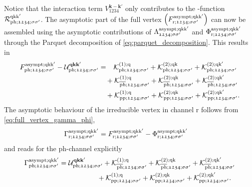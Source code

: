 \documentclass[../../main.tex]{subfiles}
\begin{document}
Notice that the interaction term $V^{\textbf{k}-\textbf{k}'}_{\mathfrak{1234}}$ only contributes to the -function $\mathcal{R}^{\text{q}\text{k}\text{k}'}_{\text{ph};\mathfrak{1234};\sigma\sigma'}$. The asymptotic part of the full vertex $\left (F_{\text{r};\mathfrak{1234};\sigma\sigma'}^{\text{asympt};\text{q}\text{k}\text{k}'}\right )$ can now be assembled using the asymptotic contributions of $\Lambda^{\text{asympt};\text{q}\text{k}\text{k}'}_{\mathfrak{1234};\sigma\sigma'}$ and $\Phi_{\text{r};\mathfrak{1234};\sigma\sigma'}^{\text{asympt};\text{q}\text{k}\text{k}'}$ through the Parquet decomposition of \eqref{eq:parquet_decomposition}. This results in
\begin{align}
\begin{split}
	F_{\text{ph};\mathfrak{1234};\sigma\sigma'}^{\text{asympt};\text{q}\text{k}\text{k}'}-\mathcal{U}^{\textbf{qkk}'}_{\text{ph};\mathfrak{1234};\sigma\sigma'}&=\phantom{+}\mathcal{K}^{(1);\text{q}}_{\text{ph};\mathfrak{1234};\sigma\sigma'} + \mathcal{K}^{(2);\text{q}\text{k}}_{\text{ph};\mathfrak{1234};\sigma\sigma'}+\mathcal{K}^{(2);\text{q}\text{k}'}_{\text{ph};\mathfrak{1234};\sigma\sigma'}\\
	&\quad+\mathcal{K}^{(1);\text{q}}_{\overline{\text{ph}};\mathfrak{1234};\sigma\sigma'} + \mathcal{K}^{(2);\text{q}\text{k}}_{\overline{\text{ph}};\mathfrak{1234};\sigma\sigma'}+\mathcal{K}^{(2);\text{q}\text{k}'}_{\overline{\text{ph}};\mathfrak{1234};\sigma\sigma'}\\
	&\quad+\mathcal{K}^{(1);\text{q}}_{\text{pp};\mathfrak{1234};\sigma\sigma'} + \mathcal{K}^{(2);\text{q}\text{k}}_{\text{pp};\mathfrak{1234};\sigma\sigma'}+\mathcal{K}^{(2);\text{q}\text{k}'}_{\text{pp};\mathfrak{1234};\sigma\sigma'}.
\end{split}
\end{align}
The asymptotic behaviour of the irreducible vertex in channel r follows from \eqref{eq:full_vertex_gamma_phi},
\begin{align}
	\Gamma_{\text{r};\mathfrak{1234};\sigma\sigma'}^{\text{asympt};\text{q}\text{k}\text{k}'}&=F_{\text{r};\mathfrak{1234};\sigma\sigma'}^{\text{asympt};\text{q}\text{k}\text{k}'}-\Phi_{\text{r};\mathfrak{1234};\sigma\sigma'}^{\text{asympt};\text{q}\text{k}\text{k}'}
\end{align}
and reads for the ph-channel explicitly
\begin{align}
\begin{split}
	\Gamma_{\text{ph};\mathfrak{1234};\sigma\sigma'}^{\text{asympt};\text{q}\text{k}\text{k}'}&=\mathcal{U}^{\textbf{qkk}'}_{\text{ph};\mathfrak{1234};\sigma\sigma'}+\mathcal{K}^{(1);\text{q}}_{\overline{\text{ph}};\mathfrak{1234};\sigma\sigma'} + \mathcal{K}^{(2);\text{q}\text{k}}_{\overline{\text{ph}};\mathfrak{1234};\sigma\sigma'}+\mathcal{K}^{(2);\text{q}\text{k}'}_{\overline{\text{ph}};\mathfrak{1234};\sigma\sigma'}\\
	&\qquad\qquad\quad\;\,+\mathcal{K}^{(1);\text{q}}_{\text{pp};\mathfrak{1234};\sigma\sigma'} + \mathcal{K}^{(2);\text{q}\text{k}}_{\text{pp};\mathfrak{1234};\sigma\sigma'}+\mathcal{K}^{(2);\text{q}\text{k}'}_{\text{pp};\mathfrak{1234};\sigma\sigma'}.
\end{split}
\end{align}
\end{document}
